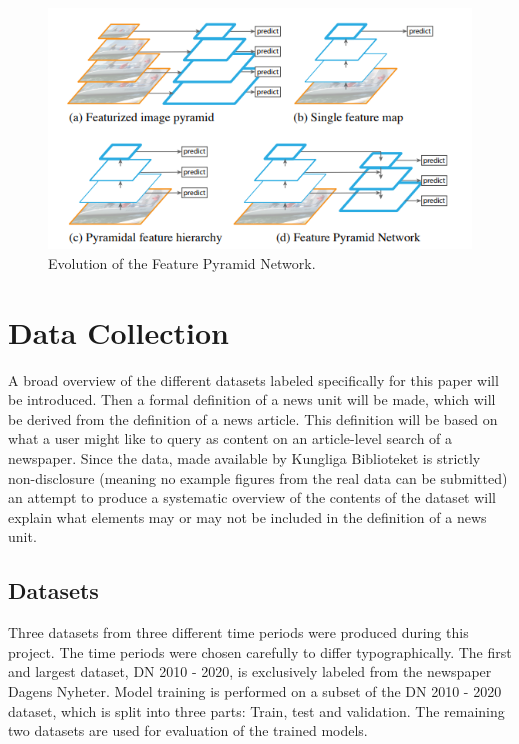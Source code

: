 \documentclass[english, bibtex]{kththesis}
\begin{document}
\begin{figure}[H]
  \begin{center}
    \includegraphics[width=1.0\textwidth]{figures/fpn.png}
  \end{center}
  \caption{Evolution of the Feature Pyramid Network\cite{DBLP:journals/corr/LinDGHHB16}.}
  \label{fig:fpn}
\end{figure}

\chapter{Data Collection}
\label{ch:data}

A broad overview of the different datasets labeled specifically for this paper will be introduced. Then a formal definition of a news unit will be made, which will be derived from the definition of a news article. This definition will be based on what a user might like to query as content on an article-level search of a newspaper. Since the data, made available by Kungliga Biblioteket is strictly non-disclosure (meaning no example figures from the real data can be submitted) an attempt to produce a systematic overview of the contents of the dataset will explain what elements may or may not be included in the definition of a news unit.

\section{Datasets}

Three datasets from three different time periods were produced during this project. The time periods were chosen carefully to differ typographically. The first and largest dataset, DN 2010 - 2020,  is exclusively labeled from the newspaper Dagens Nyheter. Model training is performed on a subset of the DN 2010 - 2020 dataset, which is split into three parts: Train, test and validation. The remaining two datasets are used for evaluation of the trained models.
\end{document}
